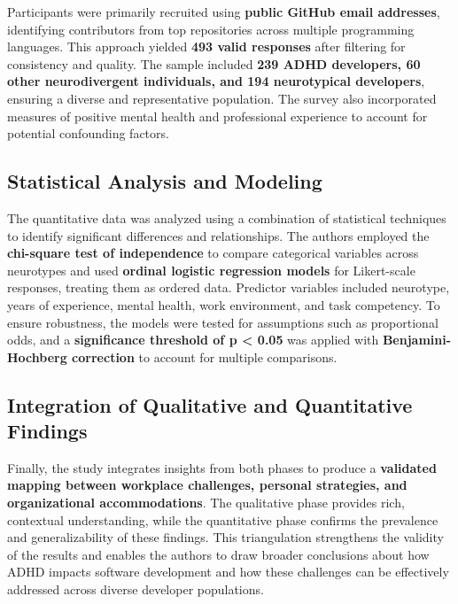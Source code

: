 Participants were primarily recruited using \textbf{public GitHub email addresses}, identifying contributors from top repositories across multiple programming languages. This approach yielded \textbf{493 valid responses} after filtering for consistency and quality. The sample included \textbf{239 ADHD developers, 60 other neurodivergent individuals, and 194 neurotypical developers}, ensuring a diverse and representative population. The survey also incorporated measures of positive mental health and professional experience to account for potential confounding factors.

\subsection{Statistical Analysis and Modeling}
The quantitative data was analyzed using a combination of statistical techniques to identify significant differences and relationships. The authors employed the \textbf{chi-square test of independence} to compare categorical variables across neurotypes and used \textbf{ordinal logistic regression models} for Likert-scale responses, treating them as ordered data. Predictor variables included neurotype, years of experience, mental health, work environment, and task competency. To ensure robustness, the models were tested for assumptions such as proportional odds, and a \textbf{significance threshold of p < 0.05} was applied with \textbf{Benjamini-Hochberg correction} to account for multiple comparisons.

\subsection{Integration of Qualitative and Quantitative Findings}
Finally, the study integrates insights from both phases to produce a \textbf{validated mapping between workplace challenges, personal strategies, and organizational accommodations}. The qualitative phase provides rich, contextual understanding, while the quantitative phase confirms the prevalence and generalizability of these findings. This triangulation strengthens the validity of the results and enables the authors to draw broader conclusions about how ADHD impacts software development and how these challenges can be effectively addressed across diverse developer populations.

